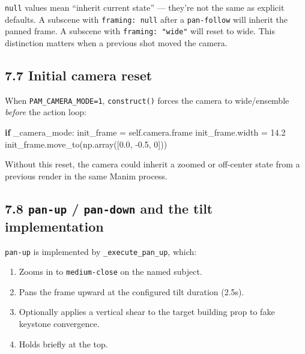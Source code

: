 \documentclass[
  12pt,
  letterpaper,
]{book}
\newenvironment{Shaded}{}{}
\newcommand{\ControlFlowTok}[1]{\textcolor[rgb]{0.00,0.44,0.13}{\textbf{#1}}}
\newcommand{\DecValTok}[1]{\textcolor[rgb]{0.25,0.63,0.44}{#1}}
\newcommand{\FloatTok}[1]{\textcolor[rgb]{0.25,0.63,0.44}{#1}}
\newcommand{\NormalTok}[1]{#1}
\newcommand{\OperatorTok}[1]{\textcolor[rgb]{0.40,0.40,0.40}{#1}}
\newcommand{\VariableTok}[1]{\textcolor[rgb]{0.10,0.09,0.49}{#1}}
\providecommand{\tightlist}{%
  \setlength{\itemsep}{0pt}\setlength{\parskip}{0pt}}
\begin{document}
\texttt{null} values mean ``inherit current state'' --- they're not the
same as explicit defaults. A subscene with \texttt{framing:\ null} after
a \texttt{pan-follow} will inherit the panned frame. A subscene with
\texttt{framing:\ "wide"} will reset to wide. This distinction matters
when a previous shot moved the camera.

\subsection{7.7 Initial camera reset}\label{initial-camera-reset}

When \texttt{PAM\_CAMERA\_MODE=1}, \texttt{construct()} forces the
camera to wide/ensemble \emph{before} the action loop:

\begin{Shaded}
\begin{Highlighting}[]
\ControlFlowTok{if}\NormalTok{ \_camera\_mode:}
\NormalTok{    init\_frame }\OperatorTok{=} \VariableTok{self}\NormalTok{.camera.frame}
\NormalTok{    init\_frame.width }\OperatorTok{=} \FloatTok{14.2}
\NormalTok{    init\_frame.move\_to(np.array([}\FloatTok{0.0}\NormalTok{, }\OperatorTok{{-}}\FloatTok{0.5}\NormalTok{, }\DecValTok{0}\NormalTok{]))}
\end{Highlighting}
\end{Shaded}

Without this reset, the camera could inherit a zoomed or off-center
state from a previous render in the same Manim process.

\subsection{\texorpdfstring{7.8 \texttt{pan-up} / \texttt{pan-down} and
the tilt
implementation}{7.8 pan-up / pan-down and the tilt implementation}}\label{pan-up-pan-down-and-the-tilt-implementation}

\texttt{pan-up} is implemented by \texttt{\_execute\_pan\_up}, which:

\begin{enumerate}
\def\labelenumi{\arabic{enumi}.}
\tightlist
\item
  Zooms in to \texttt{medium-close} on the named subject.
\item
  Pans the frame upward at the configured tilt duration (2.5s).
\item
  Optionally applies a vertical shear to the target building prop to
  fake keystone convergence.
\item
  Holds briefly at the top.
\end{enumerate}
\end{document}
